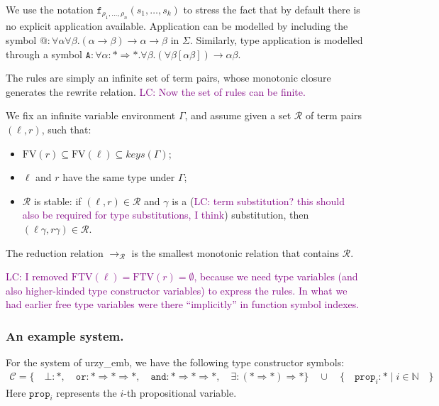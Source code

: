 \documentclass[runningheads,a4paper]{llncs}
\newcommand{\Rules}{\mathcal{R}}
\newcommand{\TypeConstructors}{\mathcal{C}}
\newcommand{\arr}[1]{\longrightarrow_{#1}}
\newcommand{\arrtype}{\rightarrow}
\newcommand{\arrkind}{\Rightarrow}
\newcommand{\FTV}{\mathrm{FTV}}
\newcommand{\FV}{\mathrm{FV}}
\newcommand{\LC}[1]{\textcolor{purple}{LC: #1}}
\begin{document}
We use the notation
$\mathtt{f}_{\rho_1,\ldots,\rho_n}(s_1,\ldots,s_k)$ to stress the fact
that by default there is no explicit application
available. Application can be modelled by including the symbol ${@} :
\forall\alpha\forall\beta . (\alpha \arrtype \beta) \arrtype \alpha
\arrtype \beta$ in $\Sigma$. Similarly, type application is modelled
through a symbol $\mathtt{A} : \forall \alpha : * \arrkind * . \forall
\beta . (\forall \beta [\alpha \beta]) \arrtype \alpha \beta$.

The rules are simply an infinite set of term pairs, whose monotonic
closure generates the rewrite relation. \LC{Now the set of rules can
  be finite.}

\begin{definition}
We fix an infinite variable environment $\Gamma$,
and assume given a set $\Rules$ of term pairs $(\ell,r)$, such that:
\begin{itemize}
\item $\FV(r) \subseteq \FV(\ell) \subseteq \mathit{keys}(\Gamma)$;
\item $\ell$ and $r$ have the same type under $\Gamma$;
\item $\Rules$ is stable: if $(\ell,r) \in \Rules$ and $\gamma$ is a
  (\LC{term substitution? this should also be required for type
  substitutions, I think}) substitution, then $(\ell\gamma,r\gamma)
  \in \Rules$.
\end{itemize}
The reduction relation $\arr{\Rules}$ is the smallest monotonic
relation that contains $\Rules$.
\end{definition}

\LC{I removed $\FTV(\ell) = \FTV(r) = \emptyset$, because we need type
  variables (and also higher-kinded type constructor variables) to
  express the rules. In what we had earlier free type variables were
  there ``implicitly'' in function symbol indexes.}

\subsubsection{An example system.}

For the system of urzy\_emb, we have the following type constructor
symbols:
\[
\begin{array}{c}
\TypeConstructors = \{\quad
  \bot : *,\quad
  \mathtt{or} : * \arrkind * \arrkind *,\quad
  \mathtt{and} : * \arrkind * \arrkind *,\quad
  \exists : (* \arrkind *) \arrkind *
  \}\quad \cup\quad
  \{\quad \mathtt{prop}_i : * \mid i \in \mathbb{N}\quad \}
\end{array}
\]
Here $\mathtt{prop}_i$ represents the $i$-th propositional variable.
\end{document}
